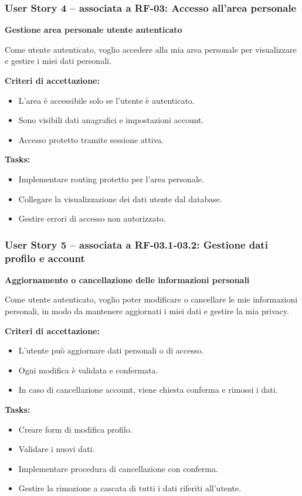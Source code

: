 \subsubsection*{User Story 4 – associata a RF-03: Accesso all’area personale}
\textbf{Gestione area personale utente autenticato}

Come utente autenticato, voglio accedere alla mia area personale per visualizzare e gestire i miei dati personali.

\textbf{Criteri di accettazione:}
\begin{itemize}
    \item L’area è accessibile solo se l’utente è autenticato.
    \item Sono visibili dati anagrafici e impostazioni account.
    \item Accesso protetto tramite sessione attiva.
\end{itemize}
\textbf{Tasks:}
\begin{itemize}
    \item Implementare routing protetto per l’area personale.
    \item Collegare la visualizzazione dei dati utente dal database.
    \item Gestire errori di accesso non autorizzato.
\end{itemize}
\subsubsection*{User Story 5 – associata a RF-03.1-03.2: Gestione dati profilo e account}
\textbf{Aggiornamento o cancellazione delle informazioni personali}

Come utente autenticato, voglio poter modificare o cancellare le mie informazioni personali, in modo da mantenere aggiornati i miei dati e gestire la mia privacy.

\textbf{Criteri di accettazione:}
\begin{itemize}
    \item L’utente può aggiornare dati personali o di accesso.
    \item Ogni modifica è validata e confermata.
    \item In caso di cancellazione account, viene chiesta conferma e rimossi i dati.
\end{itemize}
\textbf{Tasks:}
\begin{itemize}
    \item Creare form di modifica profilo.
    \item Validare i nuovi dati.
    \item Implementare procedura di cancellazione con conferma.
    \item Gestire la rimozione a cascata di tutti i dati riferiti all'utente.
\end{itemize}
